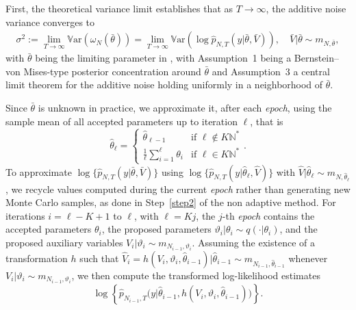 \documentclass[pdflatex,sn-mathphys-num]{sn-jnl}
\newcommand{\Var}{\mathbb{V}\text{ar}}
\newcommand{\natsstar}{\mathbb{N}^*}
\theoremstyle{thmstyleone}
\theoremstyle{thmstyletwo}
\theoremstyle{thmstylethree}
\begin{document}
First, the theoretical variance limit establishes that as $T \to \infty$, the additive noise variance converges to 
\begin{align}
    \sigma^2 :=  \lim_{T \to \infty} \Var\left( \omega_N(\bar\theta)\right) = \lim_{T \to \infty} \Var\left(\log \widehat{p}_{N,T}(y|\bar{\theta}, \bar{V})\right), \quad \bar{V}|\bar\theta \sim m_{N,\bar{\theta}},
    \label{variance}
\end{align}
with $\bar{\theta}$ being the limiting parameter in \cite[Assumption~1 and Assumption~3]{schmon_large-sample_2021}, with Assumption~1 being a Bernstein–von Mises-type posterior concentration around $\bar{\theta}$ and Assumption~3 a central limit theorem for the additive noise holding uniformly in a neighborhood of $\bar{\theta}$.

Since $\bar{\theta}$ is unknown in practice, we approximate it, after each \textit{epoch}, using the sample mean of all accepted parameters up to iteration $\ell$, that is
\begin{equation}
    \hat{\theta}_\ell =
    \begin{cases}
    \hat{\theta}_{\ell-1} & \text{if } \ell \notin K\natsstar\\
    \frac{1}{\ell}\sum_{i=1}^\ell \theta_i & \text{if } \ell \in K\natsstar
    \end{cases}.
    \label{samplemean}
\end{equation}
To approximate \( \log \{\widehat{p}_{N,T}(y|\bar{\theta}, \bar{V})\} \) using 
\( \log \{\widehat{p}_{N,T}(y|\hat{\theta}_\ell, \widehat{V})\} \) with 
\( \widehat{V}|\hat{\theta}_\ell \sim m_{N,\hat{\theta}_\ell} \), we recycle values computed during the current \textit{epoch} rather than generating new Monte Carlo samples, as done in Step~\ref{step2} of the non adaptive method. 
For iterations \( i = \ell-K+1 \) to \( \ell \), with \( \ell = Kj \), the \( j \)-th \textit{epoch} contains the accepted parameters \( \theta_i \), 
the proposed parameters \( \vartheta_i|\theta_i \sim q(\cdot|\theta_i) \), 
and the proposed auxiliary variables \( V_i|\vartheta_i \sim m_{N_{i-1},\vartheta_i} \). 
Assuming the existence of a transformation \( h \) such that 
\( \widehat{V}_i = h(V_i, \vartheta_i, \hat{\theta}_{i-1}) | \hat{\theta}_{i-1} \sim m_{N_{i-1},\hat{\theta}_{i-1}} \) 
whenever \( V_i|\vartheta_i \sim m_{N_{i-1},\vartheta_i} \), 
we then compute the transformed log-likelihood estimates
\[
\log \left\{\widehat{p}_{N_{i-1},T}\big(y|\hat{\theta}_{i-1}, h(V_i, \vartheta_i, \hat{\theta}_{i-1})\big)\right\}.
\]
\end{document}
